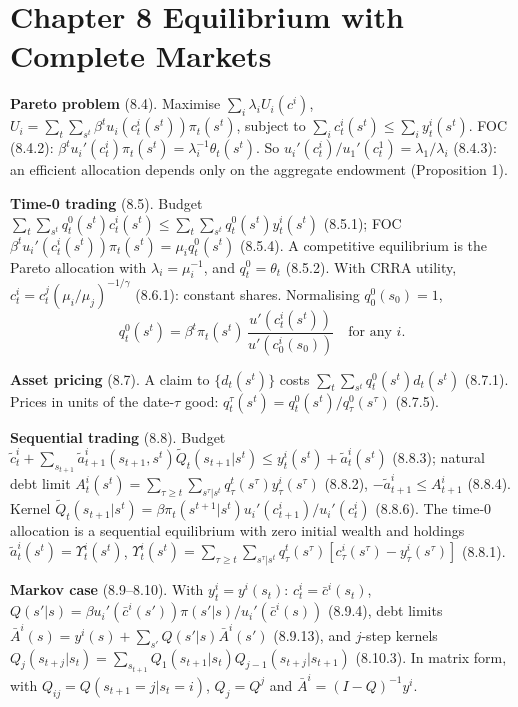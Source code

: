\documentclass[12pt, letterpaper]{article}
\begin{document}
\tableofcontents
\newpage

\section{Chapter 8 \quad Equilibrium with Complete Markets}

\begin{tcolorbox}[theorybox,title={Chapter 8 Overview}]
\textbf{Pareto problem} (8.4). Maximise $\sum_i\lambda_iU_i(c^i)$,
$U_i=\sum_t\sum_{s^t}\beta^tu_i(c^i_t(s^t))\pi_t(s^t)$, subject to $\sum_ic^i_t(s^t)\le\sum_iy^i_t(s^t)$.
FOC (8.4.2): $\beta^tu_i'(c^i_t)\pi_t(s^t)=\lambda_i^{-1}\theta_t(s^t)$. So
$u_i'(c^i_t)/u_1'(c^1_t)=\lambda_1/\lambda_i$ (8.4.3): an efficient allocation depends only on the
aggregate endowment (Proposition 1).

\textbf{Time-0 trading} (8.5). Budget $\sum_t\sum_{s^t}q^0_t(s^t)c^i_t(s^t)\le\sum_t\sum_{s^t}q^0_t(s^t)y^i_t(s^t)$
(8.5.1); FOC $\beta^tu_i'(c^i_t(s^t))\pi_t(s^t)=\mu_iq^0_t(s^t)$ (8.5.4). A competitive equilibrium
is the Pareto allocation with $\lambda_i=\mu_i^{-1}$, and $q^0_t=\theta_t$ (8.5.2). With CRRA utility,
$c^i_t=c^j_t(\mu_i/\mu_j)^{-1/\gamma}$ (8.6.1): constant shares. Normalising $q^0_0(s_0)=1$,
\[
q^0_t(s^t)=\beta^t\pi_t(s^t)\,\frac{u'(c^i_t(s^t))}{u'(c^i_0(s_0))}\quad\text{for any }i. \tag{$\ast$}
\]

\textbf{Asset pricing} (8.7). A claim to $\{d_t(s^t)\}$ costs $\sum_t\sum_{s^t}q^0_t(s^t)d_t(s^t)$ (8.7.1).
Prices in units of the date-$\tau$ good: $q^\tau_t(s^t)=q^0_t(s^t)/q^0_\tau(s^\tau)$ (8.7.5).

\textbf{Sequential trading} (8.8). Budget
$\tilde c^i_t+\sum_{s_{t+1}}\tilde a^i_{t+1}(s_{t+1},s^t)\tilde Q_t(s_{t+1}|s^t)\le y^i_t(s^t)+\tilde a^i_t(s^t)$ (8.8.3);
natural debt limit $A^i_t(s^t)=\sum_{\tau\ge t}\sum_{s^\tau|s^t}q^t_\tau(s^\tau)y^i_\tau(s^\tau)$ (8.8.2),
$-\tilde a^i_{t+1}\le A^i_{t+1}$ (8.8.4). Kernel
$\tilde Q_t(s_{t+1}|s^t)=\beta\pi_t(s^{t+1}|s^t)u_i'(c^i_{t+1})/u_i'(c^i_t)$ (8.8.6). The time-0 allocation is a
sequential equilibrium with zero initial wealth and holdings $\tilde a^i_t(s^t)=\Upsilon^i_t(s^t)$,
$\Upsilon^i_t(s^t)=\sum_{\tau\ge t}\sum_{s^\tau|s^t}q^t_\tau(s^\tau)[c^i_\tau(s^\tau)-y^i_\tau(s^\tau)]$ (8.8.1).

\textbf{Markov case} (8.9--8.10). With $y^i_t=y^i(s_t)$: $c^i_t=\bar c^i(s_t)$,
$Q(s'|s)=\beta u_i'(\bar c^i(s'))\pi(s'|s)/u_i'(\bar c^i(s))$ (8.9.4), debt limits
$\bar A^i(s)=y^i(s)+\sum_{s'}Q(s'|s)\bar A^i(s')$ (8.9.13), and $j$-step kernels
$Q_j(s_{t+j}|s_t)=\sum_{s_{t+1}}Q_1(s_{t+1}|s_t)Q_{j-1}(s_{t+j}|s_{t+1})$ (8.10.3). In matrix form, with
$Q_{ij}=Q(s_{t+1}=j|s_t=i)$, $Q_j=Q^j$ and $\bar A^i=(I-Q)^{-1}y^i$.


\end{tcolorbox}
\end{document}
